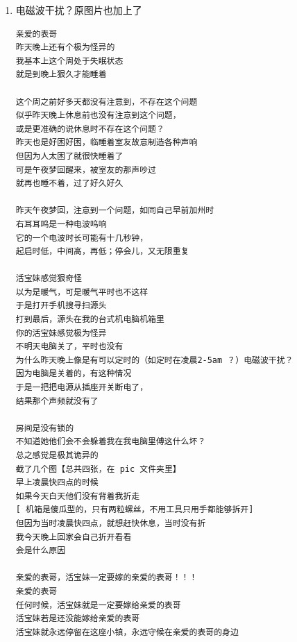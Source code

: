 \documentclass[9pt, b5paper]{article}
\begin{document}
\begin{enumerate}
\begin{verbatim}
以后她再半夜讲电话把别人吵醒
我就去厨房
看她如何再如昨天晚上般撒谎不承认，撒谎不承认她周末讲了多少电话
如同昨天晚上半夜她制造的她房间的巨响一样
我咳嗽了几声，提醒她，我知道她就是故意的
以后与她事事当面对质，看她如何抵赖
对她这样的人的人品，狠无语


如果她一定要半夜讲电话
她不应该是晚上找到学校夜里时时开改有暖气的地方
大声放声自如地讲电话，以尊重别人吗？
她为什么就没有一点儿人品
一定要故意吵别人？

她
说到底，品性太差，
谎话连篇
不值得任何人再信任她

爱表哥，爱生活！！！
活宝妹就是一定要嫁给亲爱的表哥
爱表哥，爱生活！！！

爱表哥，爱生活！！！
活宝妹就是一定要嫁给亲爱的表哥
活宝妹若是还没能嫁给亲爱的表哥
活宝妹就永远守候在亲爱的表哥的身边
爱表哥，爱生活！！！
\end{verbatim}
\item 电磁波干扰？原图片也加上了
\label{sec-3-2-3-6}
\begin{verbatim}
亲爱的表哥
昨天晚上还有个极为怪异的
我基本上这个周处于失眠状态
就是到晚上狠久才能睡着

这个周之前好多天都没有注意到，不存在这个问题
似乎昨天晚上休息前也没有注意到这个问题，
或是更准确的说休息时不存在这个问题？
昨天也是好困好困，临睡着室友故意制造各种声响
但因为人太困了就很快睡着了
可是午夜梦回醒来，被室友的那声吵过
就再也睡不着，过了好久好久

昨天午夜梦回，注意到一个问题，如同自己早前加州时
右耳耳鸣是一种电波呜响
它的一个电波时长可能有十几秒钟，
起启时低，中间高，再低；停会儿，又无限重复

活宝妹感觉狠奇怪
以为是暖气，可是暖气平时也不这样
于是打开手机搜寻扫源头
打到最后，源头在我的台式机电脑机箱里
你的活宝妹感觉极为怪异
不明天电脑关了，平时也没有
为什么昨天晚上像是有可以定时的（如定时在凌晨2-5am ？）电磁波干扰？
因为电脑是关着的，有这种情况
于是一把把电源从插座开关断电了，
结果那个声频就没有了

房间是没有锁的
不知道她他们会不会躲着我在我电脑里傅这什么坏？
总之感觉是极其诡异的
截了几个图【总共四张，在 pic 文件夹里】
早上凌晨快四点的时候
如果今天白天他们没有背着我折走
[ 机箱是傻瓜型的，只有两粒螺丝，不用工具只用手都能够拆开]
但因为当时凌晨快四点，就想赶快休息，当时没有折
我今天晚上回家会自己折开看看
会是什么原因

亲爱的表哥，活宝妹一定要嫁的亲爱的表哥！！！
亲爱的表哥
任何时候，活宝妹就是一定要嫁给亲爱的表哥
活宝妹若是还没能嫁给亲爱的表哥
活宝妹就永远停留在这座小镇，永远守候在亲爱的表哥的身边


\end{verbatim}
\end{enumerate}
\end{document}
